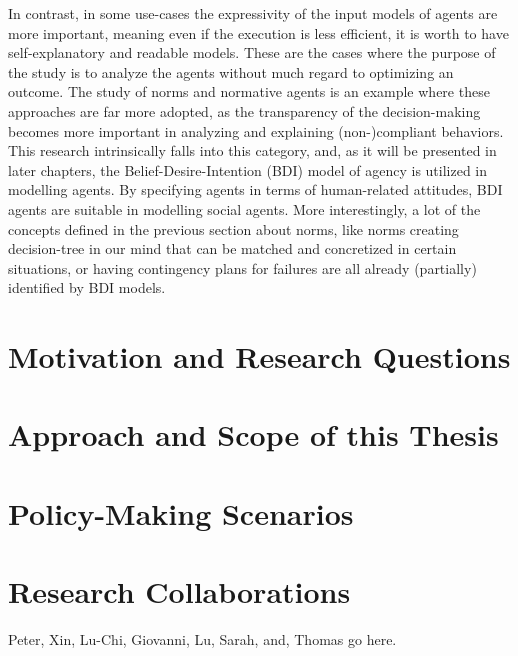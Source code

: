 In contrast, in some use-cases the expressivity of the input models of agents are more important, meaning even if the execution is less efficient, it is worth to have self-explanatory and readable models. These are the cases where the purpose of the study is to analyze the agents without much regard to optimizing an outcome. The study of norms and normative agents is an example where these approaches are far more adopted, as the transparency of the decision-making becomes more important in analyzing and explaining (non-)compliant behaviors. This research intrinsically falls into this category, and, as it will be presented in later chapters, the Belief-Desire-Intention (BDI) model of agency \cite{Something} is utilized in modelling agents. By specifying agents in terms of human-related attitudes, BDI agents are suitable in modelling social agents. More interestingly, a lot of the concepts defined in the previous section about norms, like norms creating decision-tree in our mind that can be matched and concretized in certain situations, or having contingency plans for failures are all already (partially) identified by BDI models. 


\section{Motivation and Research Questions}

\section{Approach and Scope of this Thesis}

\section{Policy-Making Scenarios}

\section{Research Collaborations}
Peter, Xin, Lu-Chi, Giovanni, Lu, Sarah, and, Thomas go here.